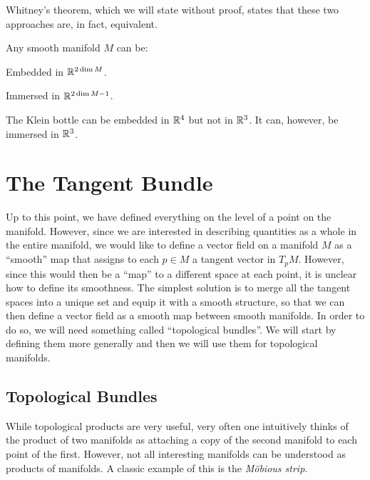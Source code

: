 Whitney's theorem, which we will state without proof, states that these two approaches are, in fact, equivalent.

\bt[Whitney]
Any smooth manifold $M$ can be:
\bit
\item Embedded in $\mathbb{R}^{2\dim M}$.
\item Immersed in $\mathbb{R}^{2\dim M-1}$.
\eit
\et

\be
The Klein bottle can be embedded in $\mathbb{R}^4$ but not in $\mathbb{R}^3$. It can, however, be immersed in $\mathbb{R}^3$.
\ee

\section{The Tangent Bundle}

Up to this point, we have defined everything on the level of a point on the manifold. However, since we are
interested in describing quantities as a whole in the entire manifold, we would like to define a vector field on a
manifold $M$ as a ``smooth'' map that assigns to each $p\in M$ a tangent vector in $T_p M$. However, since this would
then be a ``map'' to a different space at each point, it is unclear how to define its smoothness. The simplest
solution is to merge all the tangent spaces into a unique set and equip it with a smooth structure, so that we can
then define a vector field as a smooth map between smooth manifolds. In order to do so, we will need something called
``topological bundles''. We will start by defining them more generally and then we will use them for topological
manifolds.

\subsection{Topological Bundles}

While topological products are very useful, very often one intuitively thinks of the product of two manifolds as
attaching a copy of the second manifold to each point of the first. However, not all interesting manifolds can be
understood as products of manifolds. A classic example of this is the \emph{Möbious strip}.

\vspace{-0.1cm}

\begin{center}
\end{center}

